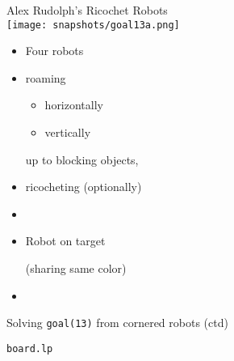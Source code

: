 \begin{frame}[c]{Alex Rudolph's Ricochet Robots\\[-5pt]\footnotesize
    }
  \bigskip\qquad\texttt{[image: snapshots/goal13a.png]}
  \qquad
  \begin{minipage}[b]{0.4\linewidth}
    \begin{itemize}
    \item<2-> Four robots
    \item<2->[] roaming
      \begin{itemize}
      \item horizontally
      \item vertically
      \end{itemize}
      up to blocking objects,
    \item<2->[] ricocheting (optionally)
    \item<2-> []
    \item<3->  Robot on target\par (sharing same color)
    \item []
    \end{itemize}
  \end{minipage}
\end{frame}
\begin{frame}{Solving \lstinline{goal(13)} from cornered robots (ctd)}
  \bigskip\quad
  \quad
  \quad
  \quad
  \\\bigskip\quad
  \quad
  \quad
  \quad
\end{frame}
\begin{frame}[fragile]{\texttt{board.lp}}
\bigskip

\end{frame}
